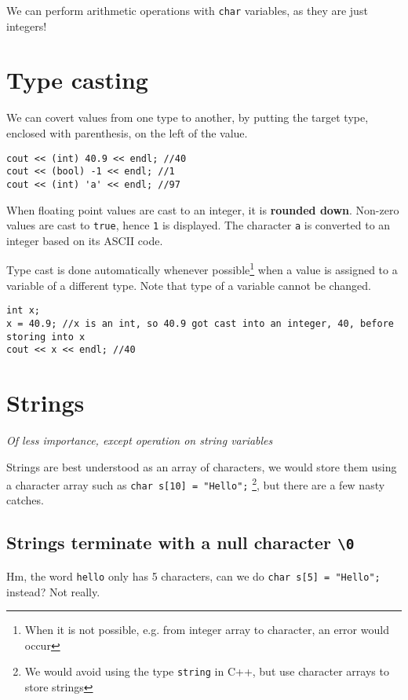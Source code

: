 We can perform arithmetic operations with \texttt{char} variables, as they are just integers! 

\section{Type casting}

We can covert values from one type to another, by putting the target type, enclosed with parenthesis, on the left of the value.

\begin{lstlisting}
cout << (int) 40.9 << endl; //40
cout << (bool) -1 << endl; //1
cout << (int) 'a' << endl; //97
\end{lstlisting}

When floating point values are cast to an integer, it is \textbf{rounded down}. Non-zero values are cast to \texttt{true}, hence \texttt{1} is displayed. The character \texttt{a} is converted to an integer based on its ASCII code.

Type cast is done automatically whenever possible\footnote{When it is not possible, e.g. from integer array to character, an error would occur} when a value is assigned to a variable of a different type. Note that type of a variable cannot be changed. 

\begin{lstlisting}
int x;
x = 40.9; //x is an int, so 40.9 got cast into an integer, 40, before storing into x
cout << x << endl; //40
\end{lstlisting}

\section{Strings}

\textit{Of less importance, except operation on string variables}


Strings are best understood as an array of characters, we would store them using a character array such as  \texttt{char s[10] = "Hello";} \footnote{We would avoid using the type \texttt{string} in C++, but use character arrays to store strings}, but there are a few nasty catches.

\subsection*{Strings terminate with a null character \texttt{\textbackslash 0}}

Hm, the word \texttt{hello} only has 5 characters, can we do \texttt{char s[5] = "Hello";} instead? Not really.

